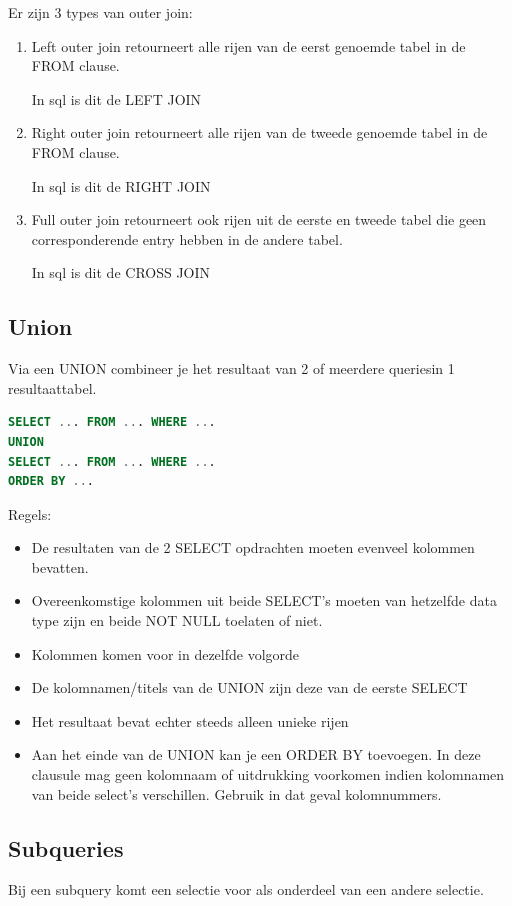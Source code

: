 \documentclass[a4paper,12pt]{article}
\begin{document}
Er zijn 3 types van outer join:
\begin{enumerate}
\item Left outer join retourneert alle rijen van de eerst genoemde tabel in de FROM clause.

In sql is dit de LEFT JOIN
\item Right outer join retourneert alle rijen van de tweede genoemde tabel in de FROM clause.

In sql is dit de RIGHT JOIN
\item Full outer join retourneert ook rijen uit de eerste en tweede tabel die geen corresponderende entry hebben in de andere tabel.

In sql is dit de CROSS JOIN
\end{enumerate}

\subsection{Union}
Via een UNION combineer je het resultaat van 2 of meerdere queriesin 1 resultaattabel.
\begin{lstlisting}[language=sql]
SELECT ... FROM ... WHERE ...
UNION
SELECT ... FROM ... WHERE ...
ORDER BY ...
\end{lstlisting}
Regels:
\begin{itemize}
\item De resultaten van de 2 SELECT opdrachten moeten evenveel kolommen bevatten.
\item Overeenkomstige kolommen uit beide SELECT’s moeten van hetzelfde data type zijn en beide NOT NULL toelaten of niet.
\item Kolommen komen voor in dezelfde volgorde
\item De kolomnamen/titels van de UNION zijn deze van de eerste SELECT
\item Het resultaat bevat echter steeds alleen unieke rijen
\item Aan het einde van de UNION kan je een ORDER BY toevoegen.
In deze clausule mag geen kolomnaam of uitdrukking voorkomen indien kolomnamen van beide select’s verschillen.
Gebruik in dat geval kolomnummers.
\end{itemize}

\subsection{Subqueries}
Bij een subquery komt een selectie voor als onderdeel van een andere selectie.
\end{document}
